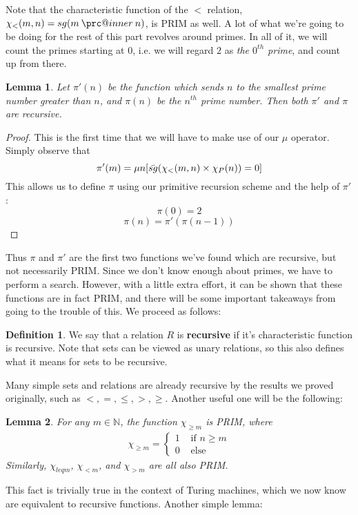 \documentclass{article}
\makeatletter
\newcommand{\prc}{\mathbin{\mathpalette\prc@inner\relax}}
\newcommand{\prc@inner}[2]{%
  \vbox{\offinterlineskip\m@th
    \ialign{%
      ##\cr
      \hidewidth\raisebox{-1.5\height}[0pt][0pt]{$#1.$}\hidewidth\cr
      $#1-$\cr
    }%
  }%
}
\theoremstyle{definition}
\newtheorem{definition}{Definition}[section]
\theoremstyle{plain}
\theoremstyle{theorem}
\newtheorem{lemma}{Lemma}[section]
\makeatother
\begin{document}
Note that the characteristic function of the $<$ relation, $\chi_<(m,n) = sg(m \prc n)$, is PRIM as well. A lot of what we're going to be doing for the rest of this part revolves around primes. In all of it, we will count the primes starting at 0, i.e. we will regard $2$ as \textit{the $0^{th}$ prime}, and count up from there.
\begin{lemma}
    Let $\pi'(n)$ be the function which sends $n$ to the smallest prime number greater than $n$, and $\pi(n)$ be the $n^{th}$ prime number. Then both $\pi'$ and $\pi$ are recursive.
\end{lemma}
\begin{proof}
    This is the first time that we will have to make use of our $\mu$ operator. Simply observe that 
    \[\pi'(m) = \mu n[\Bar{sg}(\chi_<(m,n) \times \chi_P(n))=0] \]
    This allows us to define $\pi$ using our primitive recursion scheme and the help of $\pi'$:
    \[\pi(0)=2 \]
    \[\pi(n)=\pi'(\pi(n-1)) \]
\end{proof}
Thus $\pi$ and $\pi'$ are the first two functions we've found which are recursive, but not necessarily PRIM. Since we don't know enough about primes, we have to perform a search. However, with a little extra effort, it can be shown that these functions are in fact PRIM, and there will be some important takeaways from going to the trouble of this. We proceed as follows:
\begin{definition}
    We say that a relation $R$ is \textbf{recursive} if it's characteristic function is recursive. Note that sets can be viewed as unary relations, so this also defines what it means for sets to be recursive. 
\end{definition}
Many simple sets and relations are already recursive by the results we proved originally, such as $<, =, \leq, >, \geq$. Another useful one will be the following:
\begin{lemma}
    For any $m \in \mathbb{N}$, the function $\chi_{\geq m}$ is PRIM, where 
    \begin{align}
        \chi_{\geq m} = \begin{cases}
                           1 & \textrm{ if $n \geq m$}  \\
                           0 & \textrm{ else}
                        \end{cases}
    \end{align}
    Similarly, $\chi_{leq m}$, $\chi_{< m}$, and $\chi_{> m}$ are all also PRIM. 
\end{lemma}
This fact is trivially true in the context of Turing machines, which we now know are equivalent to recursive functions. Another simple lemma:
\end{document}
